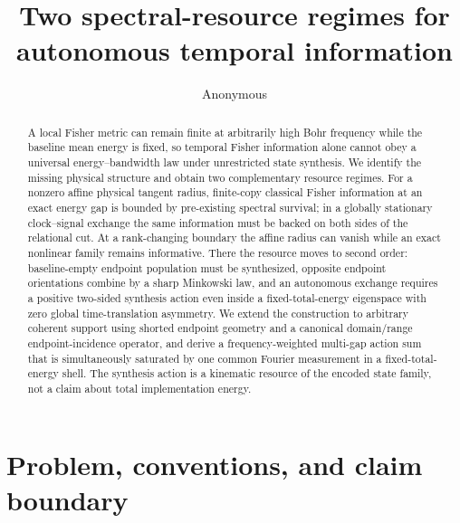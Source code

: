 \documentclass[aps,pra,preprint,nofootinbib]{revtex4-2}
\begin{document}
\title{Two spectral-resource regimes for autonomous temporal information}

\author{Anonymous}

\begin{abstract}
A local Fisher metric can remain finite at arbitrarily high Bohr frequency while the baseline mean energy is fixed, so temporal Fisher information alone cannot obey a universal energy--bandwidth law under unrestricted state synthesis. We identify the missing physical structure and obtain two complementary resource regimes. For a nonzero affine physical tangent radius, finite-copy classical Fisher information at an exact energy gap is bounded by pre-existing spectral survival; in a globally stationary clock--signal exchange the same information must be backed on both sides of the relational cut. At a rank-changing boundary the affine radius can vanish while an exact nonlinear family remains informative. There the resource moves to second order: baseline-empty endpoint population must be synthesized, opposite endpoint orientations combine by a sharp Minkowski law, and an autonomous exchange requires a positive two-sided synthesis action even inside a fixed-total-energy eigenspace with zero global time-translation asymmetry. We extend the construction to arbitrary coherent support using shorted endpoint geometry and a canonical domain/range endpoint-incidence operator, and derive a frequency-weighted multi-gap action sum that is simultaneously saturated by one common Fourier measurement in a fixed-total-energy shell. The synthesis action is a kinematic resource of the encoded state family, not a claim about total implementation energy.
\end{abstract}

\maketitle

\section{Problem, conventions, and claim boundary}
\label{sec:model}
\end{document}
